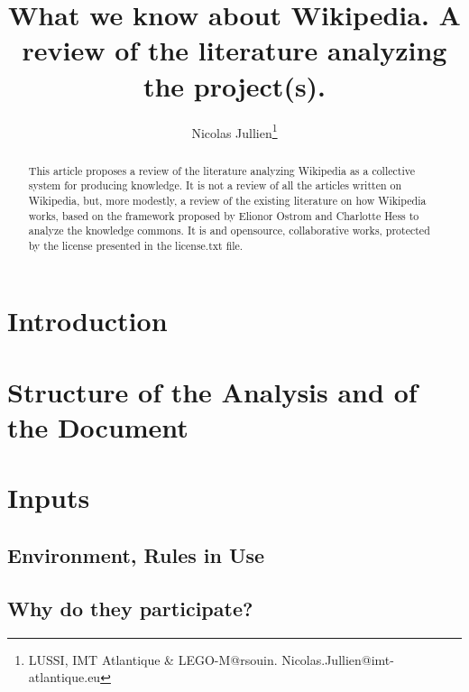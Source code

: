 \documentclass{misqdoc}
\begin{document}




\title{What we know about Wikipedia. A review of the literature analyzing
the project(s).}

\doublespacing
\author{Nicolas Jullien\thanks{LUSSI, IMT Atlantique \& LEGO-M@rsouin. Nicolas.Jullien@imt-atlantique.eu}}
\maketitle
\begin{abstract}
This article proposes a review of the literature analyzing Wikipedia
as a collective system for producing knowledge. It is not a review of all the articles written on Wikipedia, but, more modestly, a review of the existing literature on how Wikipedia
works, based on the framework proposed by Elionor Ostrom and Charlotte Hess to analyze the knowledge commons.
It is and opensource, collaborative works, protected by the license presented in the license.txt file.

\end{abstract}



\section{Introduction}\label{sec:introduction}


\section{Structure of the Analysis and of the Document}\label{sec:related}


\section{Inputs}\label{sec:Inputs}

\subsection{Environment, Rules in Use}\label{subsec:EnvironmentRules}

\subsection{Why do they participate?}\label{subsec:Why-do-they-participate}

\end{document}
